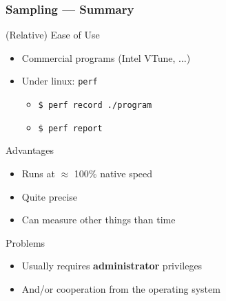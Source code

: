 \documentclass[xcolor={x11names,svgnames}]{beamer}
\begin{document}

\begin{frame}
  \frametitle{Sampling --- Summary}

  \begin{block}{(Relative) Ease of Use}
    \begin{itemize}
    \item Commercial programs (Intel VTune, ...)
    \item Under linux: \texttt{perf}
      \begin{itemize}
      \item \texttt{\$ perf record ./program}
      \item \texttt{\$ perf report} 
      \end{itemize}
      
    \end{itemize}
  \end{block}

  \begin{exampleblock}{Advantages}
    \begin{itemize}
    \item Runs at $\approx$ 100\% native speed
    \item Quite precise
    \item Can measure other things than time
    \end{itemize}
  \end{exampleblock}

  
  \begin{alertblock}{Problems}
    \begin{itemize}
    \item Usually requires \textbf{administrator} privileges
    \item And/or cooperation from the operating system
    \end{itemize}
  \end{alertblock}
  
\end{frame}

\end{document}
